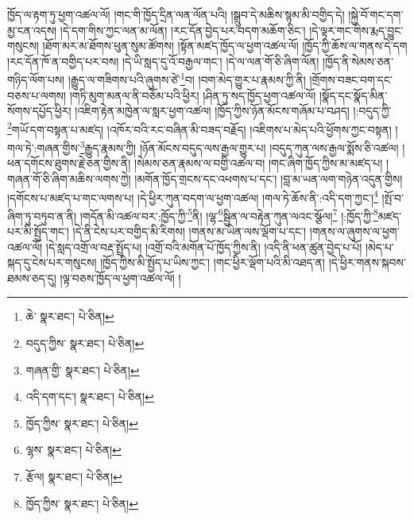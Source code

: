 ཁྱོད་ལ་རྟག་ཏུ་ཕྱག་འཚལ་ལོ། །གང་གི་ཁྱོད་དྲིན་ལན་ལོན་པའི། །སྒྲུབ་དེ་མཆིས་སྙམ་མི་བགྱིད་དེ། །སྐྱེ་བོ་གང་དག་མྱ་ངན་འདས། །དེ་དག་གིས་ཀྱང་ལན་མ་ལོན། །རང་དོན་བྱེད་པར་བདག་མཆོག་ཅིང་། །དེ་ལྟར་གང་གིས་རྨད་བྱུང་གསུངས། །ཐོག་མར་མ་ཐོགས་ཕུན་སུམ་ཚོགས། །སྟོན་མཛད་ཁྱོད་ལ་ཕྱག་འཚལ་ལོ། །ཁྱོད་ཀྱི་ཆོས་ལ་གནས་དེ་དག །རང་དོན་ཁོ་ན་བགྱིད་པར་བས། །དེ་ཡི་སླད་དུ་འོ་བརྒྱལ་གང་། །དེ་ལ་ལན་གོ་ཅི་ཞིག་ལོན། །ཁྱོད་ནི་སེམས་ཅན་གཉིད་ལོག་པས། །རྒྱུད་ལ་གཟིགས་པའི་ཞུགས་ཙེ་\footnote{ཆེ་  སྣར་ཐང་།  པེ་ཅིན། }བ། །བག་མེད་གྱུར་པ་རྣམས་ཀྱི་ནི། །གྲོགས་བཟང་བག་དང་བཅས་པ་ལགས། །གཏི་མུག་མནལ་ནི་བཅོམ་པའི་ཕྱིར། །ཤིན་ཏུ་སད་ཁྱོད་ཕྱག་འཚལ་ལོ། །སྣོད་དང་སྣོད་མིན་སོགས་དཔྱོད་ཕྱིར། །འཇིག་རྟེན་མཁྱེན་ལ་སླར་ཕྱག་འཚལ། །ཁྱོད་ཀྱིས་ཉོན་མོངས་གཞོམ་པ་བཤད། །:བདུད་ཀྱི་\footnote{བདུད་ཀྱིས་  སྣར་ཐང་།  པེ་ཅིན། }གཡོ་དག་བསྟན་པ་མཛད། །འཁོར་བའི་རང་བཞིན་མི་བཟད་བརྗོད། །འཇིགས་པ་མེད་པའི་ཕྱོགས་ཀྱང་བསྟན། །གལ་ཏེ་:གཞན་གྱིས་\footnote{གཞན་གྱི་  སྣར་ཐང་།  པེ་ཅིན། }རྒྱུད་རྣམས་ཀྱི། །ཉོན་མོངས་བདུད་ལས་རྒྱལ་གྱུར་པ། །བདུད་ཀུན་ལས་རྒྱལ་སྨོས་ཅི་འཚལ། །ཕན་དགོངས་ཐུགས་རྗེ་ཅན་གྱིས་ནི། །སེམས་ཅན་རྣམས་ལ་བགྱི་འཚལ་བ། །གང་ཞིག་ཁྱོད་ཀྱིས་མ་མཛད་པ། །གཞན་གོ་ཅི་ཞིག་མཆིས་ལགས་ཀྱེ། །མགོན་ཁྱོད་གྲངས་དང་འཕགས་པ་དང་། །བླ་མ་ཡན་ལག་གཉེན་འདུན་གྱིས། །དགོངས་པ་མཛད་པ་གང་ལགས་པ། །དེ་ཕྱིར་ཀུན་བདག་ལ་ཕྱག་འཚལ། །གལ་ཏེ་ཆོས་ནི་:འདི་དག་ཀྱང་།\footnote{འདི་དག་དང་།  སྣར་ཐང་།  པེ་ཅིན། } །སྤོ་བ་ཞིག་ཏུ་བཏུབ་ན་ནི། །གདོན་མི་འཚལ་བར་:ཁྱོད་ཀྱི་\footnote{ཁྱོད་ཀྱིས་  སྣར་ཐང་།  པེ་ཅིན། }ནི། །ལྷ་\footnote{ལྷས་  སྣར་ཐང་།  པེ་ཅིན། }སྦྱིན་ལ་བརྟེན་ཀུན་ལའང་སྩོལ།\footnote{རྩོལ།  སྣར་ཐང་།  པེ་ཅིན། } །:ཁྱོད་ཀྱི་\footnote{ཁྱོད་ཀྱིས་  སྣར་ཐང་།  པེ་ཅིན། }མཛད་པར་མི་སྤྱོད་གང་། །དེ་ནི་ངེས་པར་བགྱིད་མི་རིགས། །གནས་མ་ཡིན་ལས་ལྡོག་པ་དང་། །གནས་ལ་ཞུགས་ལ་ཕྱག་འཚལ་ལོ། །དེ་སླད་འགྲོ་ལ་བརྡ་སྤྲོད་པ། །འགྲོ་བའི་མགོན་པོ་ཁྱོད་ཀྱིས་ནི། །འདི་ནི་ཕན་ཚུན་བྱེད་པ་པོ། །མེད་པ་སྐད་དུ་ངེས་པར་གསུངས། །ཁྱོད་ཀྱིས་མི་སྤྱོད་པ་ཡིས་ཀྱང་། །གང་ཕྱིར་ལྡོག་པའི་མི་འཐད་ན། །དེ་ཕྱིར་གནས་སྐབས་ཐམས་ཅད་དུ། །ལྟ་བཅས་ཁྱོད་ལ་ཕྱག་འཚལ་ལོ། །
